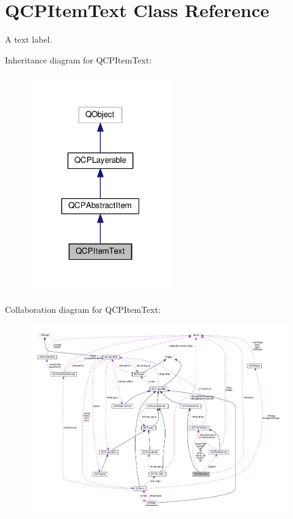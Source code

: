 \hypertarget{classQCPItemText}{}\section{Q\+C\+P\+Item\+Text Class Reference}
\label{classQCPItemText}


A text label.  




Inheritance diagram for Q\+C\+P\+Item\+Text\+:
\nopagebreak
\begin{figure}[H]
\begin{center}
\leavevmode
\includegraphics[width=175pt]{classQCPItemText__inherit__graph}
\end{center}
\end{figure}


Collaboration diagram for Q\+C\+P\+Item\+Text\+:
\nopagebreak
\begin{figure}[H]
\begin{center}
\leavevmode
\includegraphics[width=350pt]{classQCPItemText__coll__graph}
\end{center}
\end{figure}
